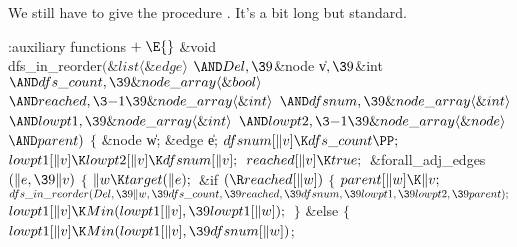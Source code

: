 We still have to give the procedure . It's a bit
long but standard.

\Y\B\4:auxiliary functions\X${}\mathrel+\E{}$\6
\&{void} \\{dfs\_in\_reorder}${}(\&{list}\langle\&{edge}\rangle{}$ ${}{\AND}%
\\{Del},\39{}$\&{node} \|v${},\39{}$\&{int} ${}{\AND}\\{dfs\_count},\39\&{node%
\_array}\langle\&{bool}\rangle{}$ ${}{\AND}\\{reached},\3{-1}\39\&{node\_array}%
\langle\&{int}\rangle{}$ ${}{\AND}\\{dfsnum},\39\&{node\_array}\langle\&{int}%
\rangle{}$ ${}{\AND}\\{lowpt1},\39\&{node\_array}\langle\&{int}\rangle{}$ ${}{%
\AND}\\{lowpt2},\3{-1}\39\&{node\_array}\langle\&{node}\rangle{}$ ${}{\AND}%
\\{parent}){}$\1\1\2\2\6
${}\{{}$\1\6
\&{node} \|w;\6
\&{edge} \|e;\7
${}\\{dfsnum}[\|v]\K\\{dfs\_count}\PP;{}$\6
${}\\{lowpt1}[\|v]\K\\{lowpt2}[\|v]\K\\{dfsnum}[\|v];{}$\6
${}\\{reached}[\|v]\K\\{true};{}$\6
\&{forall\_adj\_edges} ${}(\|e,\39\|v){}$\5
${}\{{}$\1\6
${}\|w\K\\{target}(\|e);{}$\6
\&{if} ${}(\R\\{reached}[\|w]){}$\5
${}\{{}$\1\6
${}\\{parent}[\|w]\K\|v;{}$\6
${}\\{dfs\_in\_reorder}(\\{Del},\39\|w,\39\\{dfs\_count},\39\\{reached},\39%
\\{dfsnum},\39\\{lowpt1},\39\\{lowpt2},\39\\{parent});{}$\6
${}\\{lowpt1}[\|v]\K\\{Min}(\\{lowpt1}[\|v],\39\\{lowpt1}[\|w]);{}$\6
\4${}\}{}$\2\6
\&{else}\5
${}\{{}$\1\6
${}\\{lowpt1}[\|v]\K\\{Min}(\\{lowpt1}[\|v],\39\\{dfsnum}[\|w]){}$;\6
